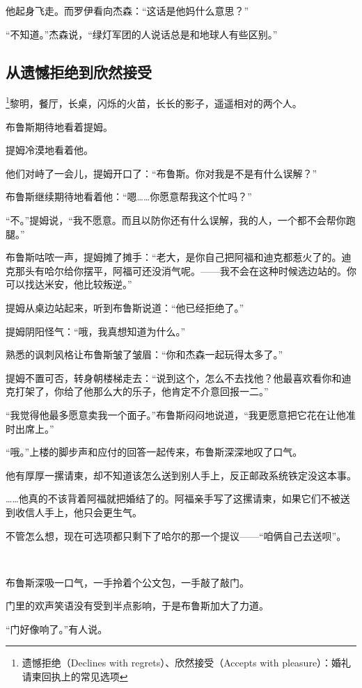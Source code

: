 \documentclass[../main]{subfiles}
\begin{document}
他起身飞走。而罗伊看向杰森：“这话是他妈什么意思？”

“不知道。”杰森说，“绿灯军团的人说话总是和地球人有些区别。”

\subsection{从遗憾拒绝到欣然接受}

\footnote[1]{遗憾拒绝（Declines with regrets）、欣然接受（Accepts with pleasure）：婚礼请柬回执上的常见选项}黎明，餐厅，长桌，闪烁的火苗，长长的影子，遥遥相对的两个人。

布鲁斯期待地看着提姆。

提姆冷漠地看着他。

他们对峙了一会儿，提姆开口了：“布鲁斯。你对我是不是有什么误解？”

布鲁斯继续期待地看着他：“嗯……你愿意帮我这个忙吗？”

“不。”提姆说，“我不愿意。而且以防你还有什么误解，我的人，一个都不会帮你跑腿。”

布鲁斯咕哝一声，提姆摊了摊手：“老大，是你自己把阿福和迪克都惹火了的。迪克那头有哈尔给你摆平，阿福可还没消气呢。——我不会在这种时候选边站的。你可以找达米安，他比较叛逆。”

提姆从桌边站起来，听到布鲁斯说道：“他已经拒绝了。”

提姆阴阳怪气：“哦，我真想知道为什么。”

熟悉的讽刺风格让布鲁斯皱了皱眉：“你和杰森一起玩得太多了。”

提姆不置可否，转身朝楼梯走去：“说到这个，怎么不去找他？他最喜欢看你和迪克打架了，你给了他那么大的乐子，他肯定不介意回报一二。”

“我觉得他最多愿意卖我一个面子。”布鲁斯闷闷地说道，“我更愿意把它花在让他准时出席上。”

“哦。”上楼的脚步声和应付的回答一起传来，布鲁斯深深地叹了口气。

他有厚厚一摞请柬，却不知道该怎么送到别人手上，反正邮政系统铁定没这本事。

……他真的不该背着阿福就把婚结了的。阿福亲手写了这摞请柬，如果它们不被送到收信人手上，他只会更生气。

不管怎么想，现在可选项都只剩下了哈尔的那一个提议——“咱俩自己去送呗”。

~\

布鲁斯深吸一口气，一手拎着个公文包，一手敲了敲门。

门里的欢声笑语没有受到半点影响，于是布鲁斯加大了力道。

“门好像响了。”有人说。
\end{document}

